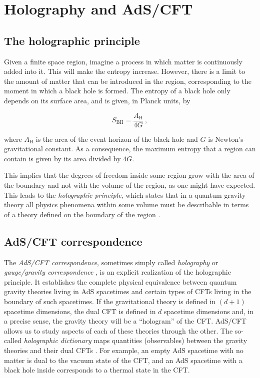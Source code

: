 \documentclass[twocolumn]{revtex4}
\providecommand{\eq}[2]{
    \begin{equation}
        #2
    \label{eq:#1}
    \end{equation}
}
\begin{document}
\section{Holography and AdS/CFT} \label{s:Holo_AdS/CFT}


\subsection{The holographic principle} \label{ss:Holography}

Given a finite space region, imagine a process in which matter is continuously added into it. This will make the entropy increase. However, there is a limit to the amount of matter that can be introduced in the region, corresponding to the moment in which a black hole is formed. The entropy of a black hole only depends on its surface area, and is given, in Planck units, by \cite{bekenstein_black_1973, hawking_particle_1975}
\eq{BH}{
    S_\text{BH} = \frac{ A_\text{H} }{ 4 G } \ ,
}
where $A_\text{H}$ is the area of the event horizon of the black hole and $G$ is Newton's gravitational constant. As a consequence, the maximum entropy that a region can contain is given by its area divided by $4G$.

This implies that the degrees of freedom inside some region grow with the area of the boundary and not with the volume of the region, as one might have expected. This leads to the \emph{holographic principle}, which states that in a quantum gravity theory all physics phenomena within some volume must be describable in terms of a theory defined on the boundary of the region \cite{t_hooft_dimensional_2009}.


\subsection{AdS/CFT correspondence} \label{ss:AdS/CFT}

The \emph{AdS/CFT correspondence}, sometimes simply called \emph{holography} or \emph{gauge/gravity correspondence} \cite{maldacena_large_1999}, is an explicit realization of the holographic principle. It establishes the complete physical equivalence between quantum gravity theories living in AdS spacetimes and certain types of CFTs living in the boundary of such spacetimes. If the gravitational theory is defined in $(d+1)$ spacetime dimensions, the dual CFT is defined in $d$ spacetime dimensions and, in a precise sense, the gravity theory will be a ``hologram'' of the CFT. AdS/CFT allows us to study aspects of each of these theories through the other. The so-called \emph{holographic dictionary} maps quantities (observables) between the gravity theories and their dual CFTs \cite{witten_anti_1998}. For example, an empty AdS spacetime with no matter is dual to the vacuum state of the CFT, and an AdS spacetime with a black hole inside corresponds to a thermal state in the CFT.
\end{document}
